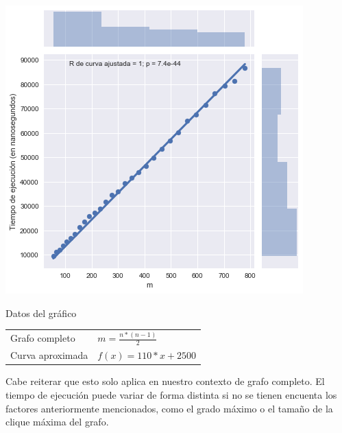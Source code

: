 \noindent
\begin{minipage}{0.55\textwidth}
    \hfill
    \includegraphics[scale=0.6]{img/greedy-complete-m.png}
\end{minipage}
\hfill
\begin{minipage}{0.44\textwidth}
    \begin{center}
        Datos del gráfico

        \begin{tabular}{ | l l |}
            \hline
            Grafo completo & $m = \frac{n * (n-1)}{2}$\\ 
            Curva aproximada & $f(x) = 110 * x + 2500$ \\
            \hline
        \end{tabular}
    \end{center}
\end{minipage}

Cabe reiterar que esto solo aplica en nuestro contexto de grafo completo. El tiempo de ejecución puede variar de forma distinta si no se tienen encuenta los factores anteriormente mencionados, como el grado máximo o el tamaño de la clique máxima del grafo.




